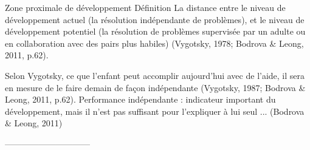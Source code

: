 Zone proximale de développement
 Définition  
 \og La distance entre le niveau de développement actuel (la résolution indépendante de problèmes), et le niveau de développement potentiel (la résolution de problèmes supervisée par un adulte ou en collaboration avec des pairs plus habiles) \fg
  (Vygotsky, 1978; Bodrova \& Leong, 2011, p.62).

 \og Selon Vygotsky, ce que l'enfant peut accomplir aujourd'hui avec de l'aide, il sera en mesure de le faire demain de façon indépendante \fg{} 
 (Vygotsky, 1987; Bodrova \& Leong, 2011, p.62).
 Performance indépendante : indicateur important du développement, mais il n'est pas suffisant pour l'expliquer à lui seul ...               (Bodrova \& Leong, 2011)


------------------------------


